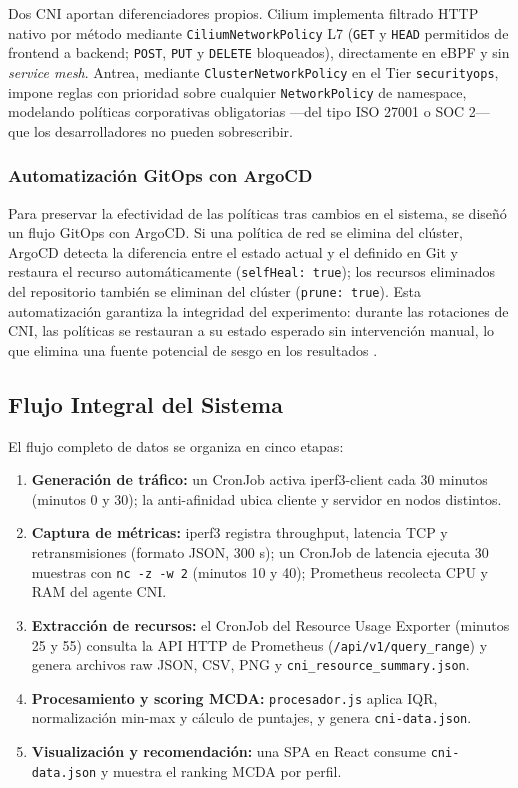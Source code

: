 Dos CNI aportan diferenciadores propios. Cilium implementa filtrado HTTP nativo por método mediante \texttt{CiliumNetworkPolicy} L7 (\texttt{GET} y \texttt{HEAD} permitidos de frontend a backend; \texttt{POST}, \texttt{PUT} y \texttt{DELETE} bloqueados), directamente en eBPF y sin \emph{service mesh}. Antrea, mediante \texttt{ClusterNetworkPolicy} en el Tier \texttt{securityops}, impone reglas con prioridad sobre cualquier \texttt{NetworkPolicy} de namespace, modelando políticas corporativas obligatorias ---del tipo ISO 27001 o SOC 2--- que los desarrolladores no pueden sobrescribir.

\subsubsection{Automatización GitOps con ArgoCD}

Para preservar la efectividad de las políticas tras cambios en el sistema, se diseñó un flujo GitOps con ArgoCD. Si una política de red se elimina del clúster, ArgoCD detecta la diferencia entre el estado actual y el definido en Git y restaura el recurso automáticamente (\texttt{selfHeal: true}); los recursos eliminados del repositorio también se eliminan del clúster (\texttt{prune: true}). Esta automatización garantiza la integridad del experimento: durante las rotaciones de CNI, las políticas se restauran a su estado esperado sin intervención manual, lo que elimina una fuente potencial de sesgo en los resultados \cite{ref25}.

\subsection{Flujo Integral del Sistema}

El flujo completo de datos se organiza en cinco etapas:
\begin{enumerate}
\item \textbf{Generación de tráfico:} un CronJob activa iperf3-client cada 30 minutos (minutos 0 y 30); la anti-afinidad ubica cliente y servidor en nodos distintos.
\item \textbf{Captura de métricas:} iperf3 registra throughput, latencia TCP y retransmisiones (formato JSON, 300 s); un CronJob de latencia ejecuta 30 muestras con \texttt{nc -z -w 2} (minutos 10 y 40); Prometheus recolecta CPU y RAM del agente CNI.
\item \textbf{Extracción de recursos:} el CronJob del Resource Usage Exporter (minutos 25 y 55) consulta la API HTTP de Prometheus (\texttt{/api/v1/query\_range}) y genera archivos raw JSON, CSV, PNG y \texttt{cni\_resource\_summary.json}.
\item \textbf{Procesamiento y scoring MCDA:} \texttt{procesador.js} aplica IQR, normalización min-max y cálculo de puntajes, y genera \texttt{cni-data.json}.
\item \textbf{Visualización y recomendación:} una SPA en React consume \texttt{cni-data.json} y muestra el ranking MCDA por perfil.
\end{enumerate}

